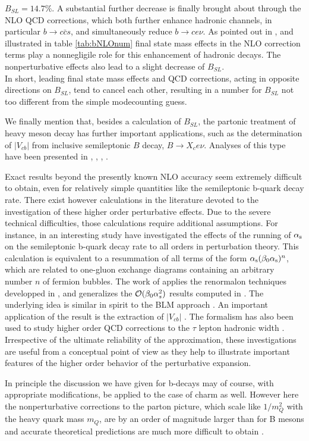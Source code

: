 $B_{SL}=14.7\%$. A substantial further decrease is finally brought
about through the NLO QCD corrections, which both further enhance
hadronic channels, in particular $b\to c\bar cs$, and simultaneously
reduce $b\to ce\nu$. As pointed out in \cite{baganetal:94b},
\cite{baganetal:95} and illustrated in table \ref{tab:bNLOnum} final
state mass effects in the NLO correction terms play a nonnegligile role
for this enhancement of hadronic decays. The nonperturbative effects
also lead to a slight decrease of $B_{SL}$.
\\
In short, leading final state mass effects and QCD corrections, acting
in opposite directions on $B_{SL}$, tend to cancel each other, 
resulting in a number for $B_{SL}$ not too different from the
simple modecounting guess.

We finally mention that, besides a calculation of $B_{SL}$, the
partonic treatment of heavy meson decay has further important
applications, such as the determination of $|V_{cb}|$ from inclusive
semileptonic $B$ decay, $B\to X_ce\nu$. Analyses of this type have been
presented in \cite{lukesavage:94}, \cite{bigiuraltsev:94},
\cite{ballnierste:94}, \cite{shifmanetal:95}.

Exact results beyond the presently known NLO accuracy seem extremely
difficult to obtain, even for relatively simple quantities like the
semileptonic b-quark decay rate.  There exist however calculations in
the literature devoted to the investigation of these higher order
perturbative effects. Due to the severe technical difficulties, those
calculations require additional assumptions. For instance, in an
interesting study \cite{braunetal:95} have investigated the effects of
the running of $\alpha_{\rm s}$ on the semileptonic b-quark decay rate to all
orders in perturbation theory. This calculation is equivalent to a
resummation of all terms of the form $\alpha_{\rm s}(\beta_0\alpha_{\rm s})^n$, which are
related to one-gluon exchange diagrams containing an arbitrary number
$n$ of fermion bubbles. The work of \cite{braunetal:95} applies the
renormalon techniques developped in \cite{benekebraun:95},
\cite{balletal:95} and generalizes the ${\cal O}(\beta_0\alpha^2_s)$
results computed in \cite{lukeetal:95}. The underlying idea is similar
in spirit to the BLM approach \cite{brodskyetal:83}.  An important
application of the result is the extraction of $|V_{cb}|$
\cite{braunetal:95}.  The formalism has also been used to study higher
order QCD corrections to the $\tau$ lepton hadronic width
\cite{balletal:95}.  Irrespective of the ultimate reliability of the
approximation, these investigations are useful from a conceptual point
of view as they help to illustrate important features of the higher
order behavior of the perturbative expansion.

In principle the discussion we have given for
b-decays may of course, with appropriate modifications, be applied to
the case of charm as well.  However here the nonperturbative
corrections to the parton picture, which scale like $1/m^2_Q$ with the
heavy quark mass $m_Q$, are by an order of magnitude larger than for B
mesons and accurate theoretical predictions are much more difficult to
obtain \cite{blokshifman:93}.
